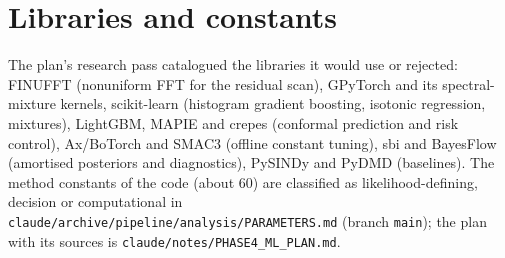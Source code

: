 \section{Libraries and constants}\label{app:libs}
The plan's research pass catalogued the libraries it would use or rejected: FINUFFT (nonuniform FFT for the residual scan), GPyTorch and its spectral-mixture kernels, scikit-learn (histogram gradient boosting, isotonic regression, mixtures), LightGBM, MAPIE and crepes (conformal prediction and risk control), Ax/BoTorch and SMAC3 (offline constant tuning), sbi and BayesFlow (amortised posteriors and diagnostics), PySINDy and PyDMD (baselines).
The method constants of the code (about $60$) are classified as likelihood-defining, decision or computational in \texttt{claude/archive/pipeline/analysis/PARAMETERS.md} (branch \texttt{main}); the plan with its sources is \texttt{claude/notes/PHASE4\_ML\_PLAN.md}.
